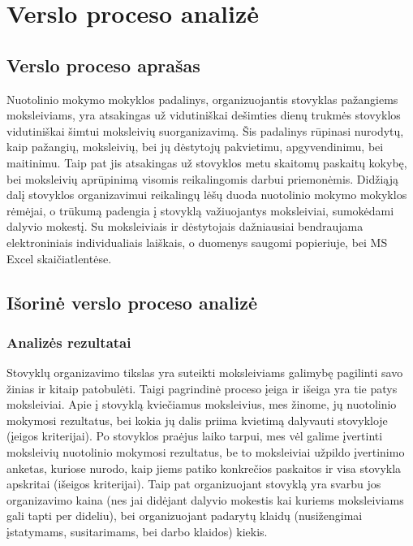 \chapter{Verslo proceso analizė}

\section{Verslo proceso aprašas}

Nuotolinio mokymo mokyklos padalinys, organizuojantis stovyklas pažangiems
moksleiviams, yra atsakingas už vidutiniškai dešimties dienų trukmės
stovyklos vidutiniškai šimtui moksleivių suorganizavimą. Šis padalinys
rūpinasi nurodytų, kaip pažangių, moksleivių, bei jų dėstytojų pakvietimu, 
apgyvendinimu, bei maitinimu. Taip pat jis atsakingas už stovyklos metu 
skaitomų paskaitų kokybę, bei moksleivių aprūpinimą visomis reikalingomis
darbui priemonėmis. Didžiąją dalį stovyklos organizavimui reikalingų lėšų
duoda nuotolinio mokymo mokyklos rėmėjai, o trūkumą padengia į stovyklą
važiuojantys moksleiviai, sumokėdami dalyvio mokestį. Su moksleiviais ir
dėstytojais dažniausiai bendraujama elektroniniais individualiais 
laiškais, o duomenys saugomi popieriuje, bei MS Excel skaičiatlentėse.

\section{Išorinė verslo proceso analizė}

\subsection{Analizės rezultatai}

Stovyklų organizavimo tikslas yra suteikti moksleiviams galimybę pagilinti
savo žinias ir kitaip patobulėti. Taigi pagrindinė proceso įeiga ir išeiga
yra tie patys moksleiviai. Apie į stovyklą kviečiamus moksleivius, mes
žinome, jų nuotolinio mokymosi rezultatus, bei kokia jų dalis priima 
kvietimą dalyvauti stovykloje (įeigos kriterijai). Po stovyklos
praėjus laiko tarpui, mes vėl galime įvertinti moksleivių nuotolinio
mokymosi rezultatus, be to moksleiviai užpildo įvertinimo anketas, kuriose
nurodo, kaip jiems patiko konkrečios paskaitos ir visa stovykla apskritai
(išeigos kriterijai). Taip pat organizuojant stovyklą yra svarbu jos 
organizavimo kaina (nes jai didėjant dalyvio mokestis kai kuriems 
moksleiviams gali tapti per dideliu), bei organizuojant padarytų klaidų
(nusižengimai įstatymams, susitarimams, bei darbo klaidos) kiekis.

